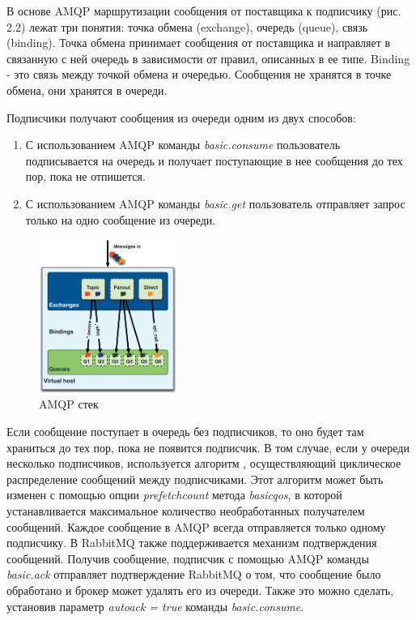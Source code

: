 В основе AMQP маршрутизации сообщения от поставщика к подписчику (рис. 2.2) лежат три понятия: точка обмена (exchange), очередь (queue), связь (binding). Точка обмена принимает сообщения от поставщика и направляет в связанную с ней очередь в зависимости от правил, описанных в ее типе. Binding - это связь между точкой обмена и очередью. Сообщения не хранятся в точке обмена, они хранятся в очереди.\par
Подписчики получают сообщения из очереди одним из двух способов:
\begin{enumerate}
  \item С использованием AMQP команды \textit{basic.consume} пользователь подписывается на очередь и получает поступающие в нее сообщения до тех пор, пока не отпишется. 
  \item С использованием AMQP команды \textit{basic.get} пользователь отправляет запрос только на одно сообщение из очереди. 
\end{enumerate}
\begin{figure}
\centering
\includegraphics[width=0.4\textwidth]{img/queues.png}
\caption{AMQP стек}
\end{figure}
Если сообщение поступает в очередь без подписчиков, то оно будет там храниться до тех пор, пока не появится подписчик. В том случае, если у очереди несколько подписчиков, используется алгоритм , осуществляющий циклическое распределение сообщений между подписчиками. Этот алгоритм может быть изменен с помощью опции \textit{prefetch\underline{\hspace{0.25cm}}count} метода \textit{basic\underline{\hspace{0.25cm}}qos}, в которой устанавливается максимальное количество необработанных получателем сообщений. Каждое сообщение в AMQP всегда отправляется только одному подписчику. В RabbitMQ также поддерживается механизм подтверждения сообщений. Получив сообщение, подписчик с помощью AMQP команды  \textit{basic.ack} отправляет подтверждение RabbitMQ о том, что сообщение было обработано и брокер может удалять его из очереди. Также это можно сделать, установив параметр  \textit{auto\underline{\hspace{0.25cm}}ack = true} команды \textit{basic.consume}.\par
